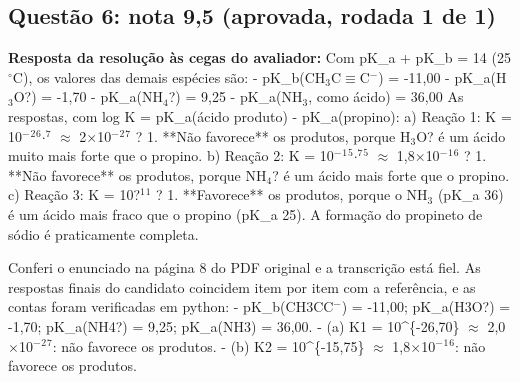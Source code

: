 \documentclass{article}%
\begin{document}
\subsection*{Questão 6: nota 9,5 (aprovada, rodada 1 de 1)}%
\textbf{Resposta da resolução às cegas do avaliador:} Com pK\_a + pK\_b = 14 (25 $^\circ$C), os valores das demais espécies são:\newline%
{-} pK\_b(CH$_{3}$C$\equiv$C$^{-}$) = -11,00\newline%
{-} pK\_a(H$_{3}$O?) = -1,70\newline%
{-} pK\_a(NH$_{4}$?) = 9,25\newline%
{-} pK\_a(NH$_{3}$, como ácido) = 36,00\newline%
\newline%
As respostas, com log K = pK\_a(ácido produto) - pK\_a(propino):\newline%
\newline%
a) Reação 1: K = 10$^{-}$$^2$$^{6}$$\cdot$$^{7}$ $\approx$ 2$\times$10$^{-}$$^2$$^{7}$ ? 1. **Não favorece** os produtos, porque H$_{3}$O? é um ácido muito mais forte que o propino.\newline%
\newline%
b) Reação 2: K = 10$^{-}$$^{1}$$^{5}$$\cdot$$^{7}$$^{5}$ $\approx$ 1,8$\times$10$^{-}$$^{1}$$^{6}$ ? 1. **Não favorece** os produtos, porque NH$_{4}$? é um ácido mais forte que o propino.\newline%
\newline%
c) Reação 3: K = 10?$^{1}$$^{1}$ ? 1. **Favorece** os produtos, porque o NH$_{3}$ (pK\_a 36) é um ácido mais fraco que o propino (pK\_a 25). A formação do propineto de sódio é praticamente completa.\par %
Conferi o enunciado na página 8 do PDF original e a transcrição está fiel. As respostas finais do candidato coincidem item por item com a referência, e as contas foram verificadas em python:\newline%
{-} pK\_b(CH3CC$^{-}$) = -11,00; pK\_a(H3O?) = -1,70; pK\_a(NH4?) = 9,25; pK\_a(NH3) = 36,00.\newline%
{-} (a) K1 = 10\^{}\{-26,70\} $\approx$ 2,0$\times$10$^{-}$$^2$$^{7}$: não favorece os produtos.\newline%
{-} (b) K2 = 10\^{}\{-15,75\} $\approx$ 1,8$\times$10$^{-}$$^{1}$$^{6}$: não favorece os produtos.\newline%
\end{document}
